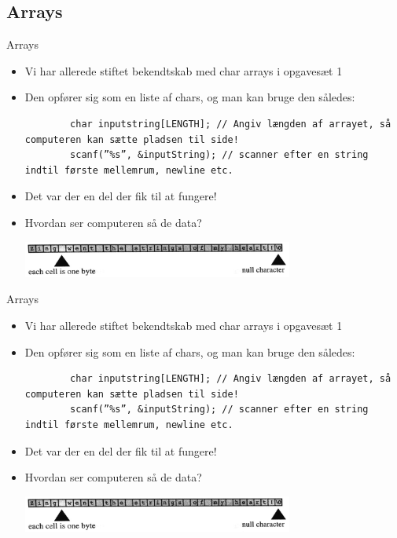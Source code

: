 \documentclass{beamer}
\begin{document}
\subsection{Arrays}

\begin{frame}[fragile]{Arrays}
	\begin{itemize}
		\item{Vi har allerede stiftet bekendtskab med char arrays i opgavesæt 1}
		\item{Den opfører sig som en liste af chars, og man kan bruge den således:}
		\begin{lstlisting}
		char inputstring[LENGTH]; // Angiv længden af arrayet, så computeren kan sætte pladsen til side!
		scanf(”%s”, &inputString); // scanner efter en string indtil første mellemrum, newline etc.
		\end{lstlisting}
		\item{Det var der en del der fik til at fungere!}
		\item{Hvordan ser computeren så de data?}
		\begin{center}
		\includegraphics[width=0.7\textwidth]{assets/char_array.png}
		\end{center}
	\end{itemize}
\end{frame}


\begin{frame}[fragile]{Arrays}
	\begin{itemize}
		\item{Vi har allerede stiftet bekendtskab med char arrays i opgavesæt 1}
		\item{Den opfører sig som en liste af chars, og man kan bruge den således:}
		\begin{lstlisting}
		char inputstring[LENGTH]; // Angiv længden af arrayet, så computeren kan sætte pladsen til side!
		scanf(”%s”, &inputString); // scanner efter en string indtil første mellemrum, newline etc.
		\end{lstlisting}
		\item{Det var der en del der fik til at fungere!}
		\item{Hvordan ser computeren så de data?}
		\begin{center}
		\includegraphics[width=0.7\textwidth]{assets/char_array.png}
		\end{center}
	\end{itemize}
\end{frame}
\end{document}
